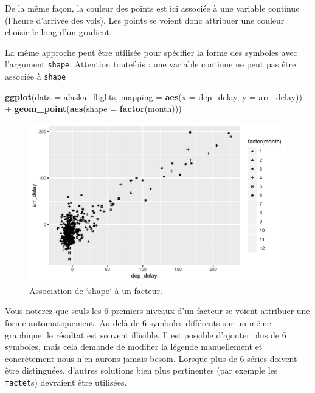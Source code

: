 \documentclass[
  a4paper,
]{article}
\newenvironment{Shaded}{\begin{snugshade}}{\end{snugshade}}
\newcommand{\DataTypeTok}[1]{\textcolor[rgb]{0.00,0.34,0.68}{#1}}
\newcommand{\KeywordTok}[1]{\textcolor[rgb]{0.12,0.11,0.11}{\textbf{#1}}}
\newcommand{\NormalTok}[1]{\textcolor[rgb]{0.12,0.11,0.11}{#1}}
\newcommand{\OperatorTok}[1]{\textcolor[rgb]{0.12,0.11,0.11}{#1}}
\newcommand{\StringTok}[1]{\textcolor[rgb]{0.75,0.01,0.01}{#1}}
\begin{document}
De la même façon, la couleur des points est ici associée à une variable continue (l'heure d'arrivée des vols). Les points se voient donc attribuer une couleur choisie le long d'un gradient.

La même approche peut être utilisée pour spécifier la forme des symboles avec l'argument \texttt{shape}. Attention toutefois : une variable continue ne peut pas être associée à \texttt{shape}

\begin{Shaded}
\begin{Highlighting}[]
\KeywordTok{ggplot}\NormalTok{(}\DataTypeTok{data =}\NormalTok{ alaska_flights, }\DataTypeTok{mapping =} \KeywordTok{aes}\NormalTok{(}\DataTypeTok{x =}\NormalTok{ dep_delay, }\DataTypeTok{y =}\NormalTok{ arr_delay)) }\OperatorTok{+}
\StringTok{  }\KeywordTok{geom_point}\NormalTok{(}\KeywordTok{aes}\NormalTok{(}\DataTypeTok{shape =} \KeywordTok{factor}\NormalTok{(month)))}
\end{Highlighting}
\end{Shaded}

\begin{figure}[htpb]

{\centering \includegraphics[width=0.9\linewidth]{figure/shapeplot-1} 

}

\caption{Association de `shape` à un facteur.}\label{fig:shapeplot}
\end{figure}

Vous noterez que seuls les 6 premiers niveaux d'un facteur se voient attribuer une forme automatiquement. Au delà de 6 symboles différents sur un même graphique, le résultat est souvent illisible. Il est possible d'ajouter plus de 6 symboles, mais cela demande de modifier la légende manuellement et concrètement nous n'en aurons jamais besoin. Lorsque plus de 6 séries doivent être distinguées, d'autres solutions bien plus pertinentes (par exemple les \texttt{factet}s) devraient être utilisées.
\end{document}
